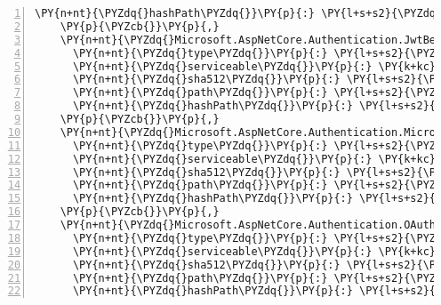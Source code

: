 \begin{Verbatim}[commandchars=\\\{\},numbers=left,firstnumber=1,stepnumber=1,numberblanklines=0]
      \PY{n+nt}{\PYZdq{}hashPath\PYZdq{}}\PY{p}{:} \PY{l+s+s2}{\PYZdq{}microsoft.aspnetcore.authentication.google.2.1.0\PYZhy{}rc1\PYZhy{}final.nupkg.sha512\PYZdq{}}
    \PY{p}{\PYZcb{}}\PY{p}{,}
    \PY{n+nt}{\PYZdq{}Microsoft.AspNetCore.Authentication.JwtBearer/2.1.0\PYZhy{}rc1\PYZhy{}final\PYZdq{}}\PY{p}{:} \PY{p}{\PYZob{}}
      \PY{n+nt}{\PYZdq{}type\PYZdq{}}\PY{p}{:} \PY{l+s+s2}{\PYZdq{}package\PYZdq{}}\PY{p}{,}
      \PY{n+nt}{\PYZdq{}serviceable\PYZdq{}}\PY{p}{:} \PY{k+kc}{true}\PY{p}{,}
      \PY{n+nt}{\PYZdq{}sha512\PYZdq{}}\PY{p}{:} \PY{l+s+s2}{\PYZdq{}sha512\PYZhy{}CPQYvv9g5ngRtPVgE3zxOmROOiAwQbhWmmIOJIzMtd6smkh6hC7pFj8MnQsjeY7vnLvq8sttAW5/3mSMVULRqg==\PYZdq{}}\PY{p}{,}
      \PY{n+nt}{\PYZdq{}path\PYZdq{}}\PY{p}{:} \PY{l+s+s2}{\PYZdq{}microsoft.aspnetcore.authentication.jwtbearer/2.1.0\PYZhy{}rc1\PYZhy{}final\PYZdq{}}\PY{p}{,}
      \PY{n+nt}{\PYZdq{}hashPath\PYZdq{}}\PY{p}{:} \PY{l+s+s2}{\PYZdq{}microsoft.aspnetcore.authentication.jwtbearer.2.1.0\PYZhy{}rc1\PYZhy{}final.nupkg.sha512\PYZdq{}}
    \PY{p}{\PYZcb{}}\PY{p}{,}
    \PY{n+nt}{\PYZdq{}Microsoft.AspNetCore.Authentication.MicrosoftAccount/2.1.0\PYZhy{}rc1\PYZhy{}final\PYZdq{}}\PY{p}{:} \PY{p}{\PYZob{}}
      \PY{n+nt}{\PYZdq{}type\PYZdq{}}\PY{p}{:} \PY{l+s+s2}{\PYZdq{}package\PYZdq{}}\PY{p}{,}
      \PY{n+nt}{\PYZdq{}serviceable\PYZdq{}}\PY{p}{:} \PY{k+kc}{true}\PY{p}{,}
      \PY{n+nt}{\PYZdq{}sha512\PYZdq{}}\PY{p}{:} \PY{l+s+s2}{\PYZdq{}sha512\PYZhy{}Oseg5u1RZ6LUUn5jmUXWQNx7JNydh6I8J7y4fb+lx+ZCnwnB76ZOTM8rZ/DQVl8+OhZFBjz589JEOoAt+G+xeA==\PYZdq{}}\PY{p}{,}
      \PY{n+nt}{\PYZdq{}path\PYZdq{}}\PY{p}{:} \PY{l+s+s2}{\PYZdq{}microsoft.aspnetcore.authentication.microsoftaccount/2.1.0\PYZhy{}rc1\PYZhy{}final\PYZdq{}}\PY{p}{,}
      \PY{n+nt}{\PYZdq{}hashPath\PYZdq{}}\PY{p}{:} \PY{l+s+s2}{\PYZdq{}microsoft.aspnetcore.authentication.microsoftaccount.2.1.0\PYZhy{}rc1\PYZhy{}final.nupkg.sha512\PYZdq{}}
    \PY{p}{\PYZcb{}}\PY{p}{,}
    \PY{n+nt}{\PYZdq{}Microsoft.AspNetCore.Authentication.OAuth/2.1.0\PYZhy{}rc1\PYZhy{}final\PYZdq{}}\PY{p}{:} \PY{p}{\PYZob{}}
      \PY{n+nt}{\PYZdq{}type\PYZdq{}}\PY{p}{:} \PY{l+s+s2}{\PYZdq{}package\PYZdq{}}\PY{p}{,}
      \PY{n+nt}{\PYZdq{}serviceable\PYZdq{}}\PY{p}{:} \PY{k+kc}{true}\PY{p}{,}
      \PY{n+nt}{\PYZdq{}sha512\PYZdq{}}\PY{p}{:} \PY{l+s+s2}{\PYZdq{}sha512\PYZhy{}1xf0OyyuuzjbQY1vG+7nWpBANwKrLzYUL8pCbGugK7Q30PXY3Qwr1Of9jzBLp9ei64A8ac5cxViJcIb+WszoMg==\PYZdq{}}\PY{p}{,}
      \PY{n+nt}{\PYZdq{}path\PYZdq{}}\PY{p}{:} \PY{l+s+s2}{\PYZdq{}microsoft.aspnetcore.authentication.oauth/2.1.0\PYZhy{}rc1\PYZhy{}final\PYZdq{}}\PY{p}{,}
      \PY{n+nt}{\PYZdq{}hashPath\PYZdq{}}\PY{p}{:} \PY{l+s+s2}{\PYZdq{}microsoft.aspnetcore.authentication.oauth.2.1.0\PYZhy{}rc1\PYZhy{}final.nupkg.sha512\PYZdq{}}

\end{Verbatim}

